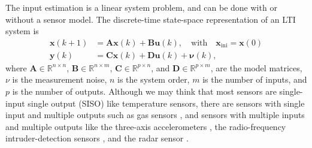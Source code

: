 The input estimation is a linear system problem, and can be done with or without a sensor model.
The discrete-time state-space representation of an LTI system is
\begin{equation} \begin{aligned} \mathbf{x}(k+1) &= \mathbf{A} \mathbf{x}(k) + \mathbf{B} \mathbf{u}(k), \quad \text{with} \quad \mathbf{x}_{\text{ini}} = \mathbf{x}(0) \\ 
\mathbf{y}(k) &= \mathbf{C} \mathbf{x}(k) + \mathbf{D} \mathbf{u}(k) + \mathbf{\nu}(k),  \label{eqn:dtsslti} \end{aligned} \end{equation}
where $\mathbf{A} \in \mathbb{R}^{n \times n}$, $\mathbf{B} \in \mathbb{R}^{n \times m}$, $\mathbf{C} \in \mathbb{R}^{p \times n}$, and $\mathbf{D} \in \mathbb{R}^{p \times m}$, are the model matrices, $\nu$ is the measurement noise, $n$ is the system order, $m$ is the number of inputs, and $p$ is the number of outputs.
Although we may think that most sensors are single-input single output (SISO) like temperature sensors, there are sensors with single input and multiple outputs such as gas sensors \citep{Munther19}, and sensors with multiple inputs and multiple outputs like the three-axis accelerometers \citep{DEmilia16}, the radio-frequency intruder-detection sensors \citep{Ushiki13}, and the radar sensor \citep{Kueppers17}.

